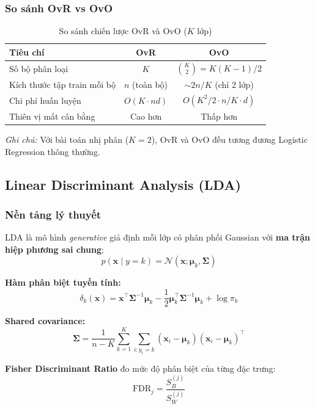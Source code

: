 \documentclass[12pt, a4paper]{article}
\begin{document}
\subsubsection{So sánh OvR vs OvO}
\begin{table}[H]
  \centering
  \caption{So sánh chiến lược OvR và OvO ($K$ lớp)}
  \begin{tabular}{lcc}
    \toprule
    \textbf{Tiêu chí} & \textbf{OvR} & \textbf{OvO} \\
    \midrule
    Số bộ phân loại & $K$ & $\binom{K}{2} = K(K-1)/2$ \\
    Kích thước tập train mỗi bộ & $n$ (toàn bộ) & $\sim 2n/K$ (chỉ 2 lớp) \\
    Chi phí huấn luyện & $O(K \cdot nd)$ & $O(K^2/2 \cdot n/K \cdot d)$ \\
    Thiên vị mất cân bằng & Cao hơn & Thấp hơn \\
    \bottomrule
  \end{tabular}
\end{table}

\textit{Ghi chú:} Với bài toán nhị phân ($K=2$), OvR và OvO đều tương đương Logistic Regression thông thường.


\subsection{Linear Discriminant Analysis (LDA)}
\label{ssec:lda}

\subsubsection{Nền tảng lý thuyết}

LDA là mô hình \emph{generative} giả định mỗi lớp có phân phối Gaussian với \textbf{ma trận hiệp phương sai chung}:
$$p(\mathbf{x} \mid y=k) = \mathcal{N}(\mathbf{x}; \boldsymbol{\mu}_k, \boldsymbol{\Sigma})$$

\textbf{Hàm phân biệt tuyến tính:}
$$\delta_k(\mathbf{x}) = \mathbf{x}^\top \boldsymbol{\Sigma}^{-1} \boldsymbol{\mu}_k - \frac{1}{2}\boldsymbol{\mu}_k^\top \boldsymbol{\Sigma}^{-1} \boldsymbol{\mu}_k + \log\pi_k$$

\textbf{Shared covariance:}
$$\boldsymbol{\Sigma} = \frac{1}{n - K}\sum_{k=1}^{K}\sum_{i: y_i=k} (\mathbf{x}_i - \boldsymbol{\mu}_k)(\mathbf{x}_i - \boldsymbol{\mu}_k)^\top$$

\textbf{Fisher Discriminant Ratio} đo mức độ phân biệt của từng đặc trưng:
$$\text{FDR}_j = \frac{S_B^{(j)}}{S_W^{(j)}}$$
\end{document}
